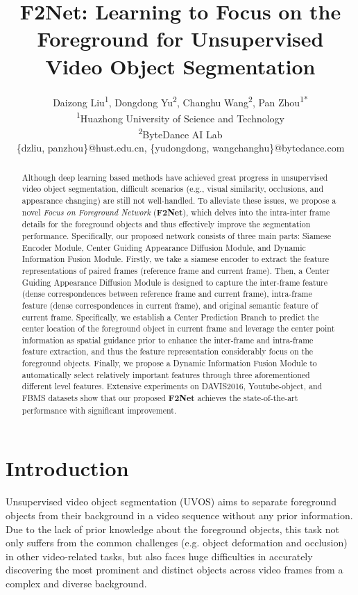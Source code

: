 \documentclass[letterpaper]{article} \usepackage{aaai20}  \usepackage{times}  \usepackage{helvet} \usepackage{courier}  \usepackage[hyphens]{url}  \usepackage{graphicx} \urlstyle{rm} \def\UrlFont{\rm}  \usepackage{graphicx}  \frenchspacing  \setlength{\pdfpagewidth}{8.5in}  \setlength{\pdfpageheight}{11in}  \usepackage{amssymb}
\title{F2Net: Learning to Focus on the Foreground for Unsupervised Video Object Segmentation}
\author{Daizong Liu\textsuperscript{\rm 1}, Dongdong Yu\textsuperscript{\rm 2}, Changhu Wang\textsuperscript{\rm 2}, Pan Zhou\textsuperscript{\rm 1*}\\
\textsuperscript{\rm 1}Huazhong University of Science and Technology\\
\textsuperscript{\rm 2}ByteDance AI Lab\\
\{dzliu, panzhou\}@hust.edu.cn, \{yudongdong, wangchanghu\}@bytedance.com
}
\begin{document}
\maketitle
\begin{abstract}
Although deep learning based methods have achieved great progress in unsupervised video object segmentation, difficult scenarios (e.g., visual similarity, occlusions, and appearance changing) are still not well-handled. To alleviate these issues, we propose a novel \textit{Focus on Foreground Network} (\textbf{F2Net}), which delves into the intra-inter frame details for the foreground objects and thus effectively improve the segmentation performance. Specifically, our proposed network consists of three main parts: Siamese Encoder Module, Center Guiding Appearance Diffusion Module, and Dynamic Information Fusion Module. Firstly, we take a siamese encoder to extract the feature representations of paired frames (reference frame and current frame). Then, a Center Guiding Appearance Diffusion Module is designed to capture the inter-frame feature (dense correspondences between reference frame and current frame), intra-frame feature (dense correspondences in current frame), and original semantic feature of current frame. Specifically, we establish a Center Prediction Branch to predict the center location of the foreground object in current frame and leverage the center point information as spatial guidance prior to enhance the inter-frame and intra-frame feature extraction, and thus the feature representation considerably focus on the foreground objects. Finally, we propose a Dynamic Information Fusion Module to automatically select relatively important features through three aforementioned different level features. Extensive experiments on DAVIS2016, Youtube-object, and FBMS datasets show that our proposed \textbf{F2Net} achieves the state-of-the-art performance with significant improvement.
\end{abstract}

\section{Introduction}
Unsupervised video object segmentation (UVOS)
aims to separate foreground objects from their background in a video sequence without any prior information. Due to the lack of prior knowledge about the foreground objects, this task not only suffers from the common challenges (e.g. object deformation and occlusion) in other video-related tasks, but also faces huge difficulties in accurately discovering the most prominent and distinct objects across video frames from a complex and diverse background. 
\end{document}
